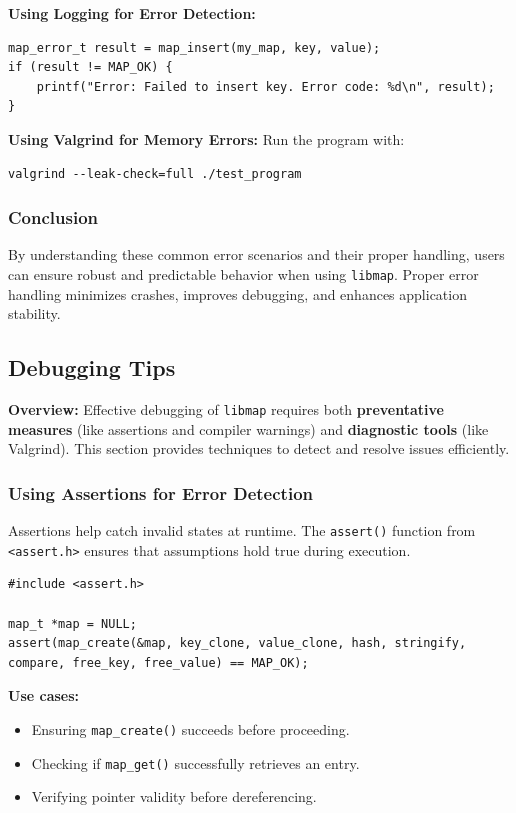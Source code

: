 \documentclass[titlepage]{article}
\begin{document}
\textbf{Using Logging for Error Detection:}
\begin{verbatim}
map_error_t result = map_insert(my_map, key, value);
if (result != MAP_OK) {
    printf("Error: Failed to insert key. Error code: %d\n", result);
}
\end{verbatim}

\textbf{Using Valgrind for Memory Errors:}
Run the program with:
\begin{verbatim}
valgrind --leak-check=full ./test_program
\end{verbatim}

\subsubsection{Conclusion}

By understanding these common error scenarios and their proper handling, users can ensure robust and predictable behavior when using \texttt{libmap}. Proper error handling minimizes crashes, improves debugging, and enhances application stability.


\subsection{Debugging Tips}

\textbf{Overview:}
Effective debugging of \texttt{libmap} requires both \textbf{preventative measures} (like assertions and compiler warnings) and \textbf{diagnostic tools} (like Valgrind). This section provides techniques to detect and resolve issues efficiently.

\subsubsection{Using Assertions for Error Detection}

Assertions help catch invalid states at runtime. The \texttt{assert()} function from \texttt{<assert.h>} ensures that assumptions hold true during execution.

\begin{verbatim}
#include <assert.h>

map_t *map = NULL;
assert(map_create(&map, key_clone, value_clone, hash, stringify, compare, free_key, free_value) == MAP_OK);
\end{verbatim}

\textbf{Use cases:}
\begin{itemize}
    \item Ensuring \texttt{map\_create()} succeeds before proceeding.
    \item Checking if \texttt{map\_get()} successfully retrieves an entry.
    \item Verifying pointer validity before dereferencing.
\end{itemize}
\end{document}
